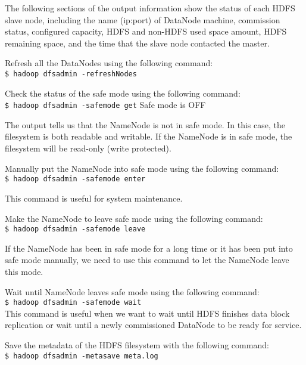 The following sections of the output information show the status of each HDFS slave node, including the name (ip:port) of DataNode machine, commission status, configured capacity, HDFS and non-HDFS used space amount, HDFS remaining space, and the time that the slave node contacted the master.

Refresh all the DataNodes using the following command: \\
\verb|$ hadoop dfsadmin -refreshNodes|

Check the status of the safe mode using the following command: \\
\verb|$ hadoop dfsadmin -safemode get|
Safe mode is OFF

The output tells us that the NameNode is not in safe mode. In this case, the filesystem is both readable and writable. If the NameNode is in safe mode, the filesystem will be read-only (write protected).

Manually put the NameNode into safe mode using the following command: \\
\verb|$ hadoop dfsadmin -safemode enter|

This command is useful for system maintenance.

Make the NameNode to leave safe mode using the following command: \\
\verb|$ hadoop dfsadmin -safemode leave|

If the NameNode has been in safe mode for a long time or it has been put into safe mode manually, we need to use this command to let the NameNode leave this mode.

Wait until NameNode leaves safe mode using the following command:\\
\verb|$ hadoop dfsadmin -safemode wait|\\
This command is useful when we want to wait until HDFS finishes data block replication or wait until a newly commissioned DataNode to be ready for service.

Save the metadata of the HDFS filesystem with the following command: \\
\verb|$ hadoop dfsadmin -metasave meta.log|

